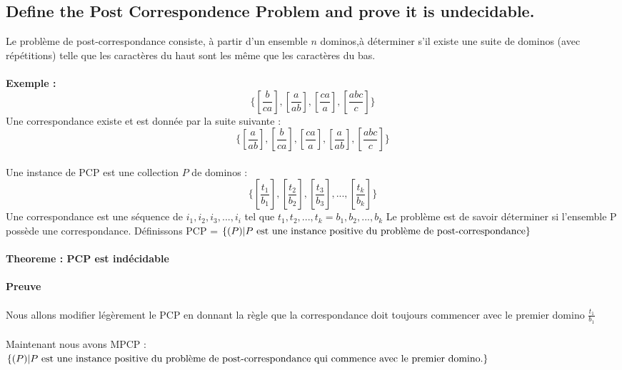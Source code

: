 \subsection{Define the Post Correspondence Problem and prove it is undecidable. }
Le problème de post-correspondance consiste, à partir d'un ensemble $n$ dominos,à déterminer s'il existe une suite de dominos (avec répétitions) telle que les caractères du haut sont les même que les caractères du bas.
\paragraph{}
\textbf{Exemple :}
\[\{[\frac{b}{ca}], [\frac{a}{ab}], [\frac{ca}{a}], [\frac{abc}{c}]\}\]
Une correspondance existe et est donnée par la suite suivante :
\[\{ [\frac{a}{ab}], [\frac{b}{ca}], [\frac{ca}{a}], [\frac{a}{ab}], [\frac{abc}{c}] \}\]

\paragraph{}
Une instance de PCP est une collection $P$ de dominos :
\[\{ [\frac{t_1}{b_1}], [\frac{t_2}{b_2}], [\frac{t_3}{b_3}], ..., [\frac{t_k}{b_k}] \}\]
Une correspondance est une séquence de $i_1, i_2, i_3, ..., i_i$ tel que $t_1, t_2,..., t_k = b_1, b_2, ..., b_k$
Le problème est de savoir déterminer si l'ensemble P possède une correspondance. Définissons PCP = \(\{ (P) | P$ est une instance positive du problème de post-correspondance$ \}\)

\paragraph{}
\textbf{Theoreme : PCP est indécidable}
\paragraph{}
\textbf{Preuve}
\paragraph{}
Nous allons modifier légèrement le PCP en donnant la règle que la correspondance doit toujours commencer avec le premier domino $\frac{t_1}{b_1}$
\paragraph{}
Maintenant nous avons MPCP : \( \{ (P)|P$ est une instance positive du problème de post-correspondance qui commence avec le premier domino.$ \} \)

